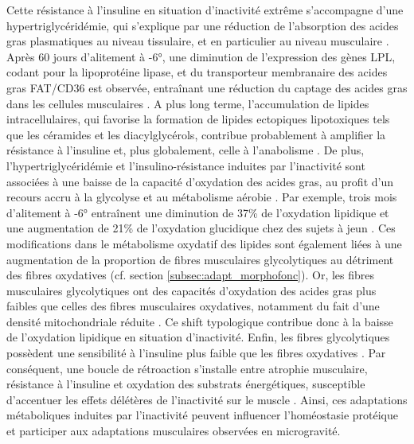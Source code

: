 \documentclass[11pt]{report}
\begin{document}
Cette résistance à l'insuline en situation d'inactivité extrême s'accompagne d'une hypertriglycéridémie, qui s'explique par une réduction de l'absorption des acides gras plasmatiques au niveau tissulaire, et en particulier au niveau musculaire \parencite{bergouignan_physical_2011}. Après 60 jours d'alitement à -6°, une diminution de l'expression des gènes LPL, codant pour la lipoprotéine lipase, et du transporteur membranaire des acides gras FAT/CD36 est observée, entraînant une réduction du captage des acides gras dans les cellules musculaires \parencite{Bergouignan2009Feb}. A plus long terme, l'accumulation de lipides intracellulaires, qui favorise la formation de lipides ectopiques lipotoxiques tels que les céramides et les diacylglycérols, contribue probablement à amplifier la résistance à l'insuline et, plus globalement, celle à l'anabolisme \parencite{Eggelbusch2024Jan,Kwon2016Nov}. De plus, l'hypertriglycéridémie et l'insulino-résistance induites par l'inactivité sont associées à une baisse de la capacité d'oxydation des acides gras, au profit d'un recours accru à la glycolyse et au métabolisme aérobie \parencite{bergouignan_physical_2011,Eggelbusch2024Jan}. Par exemple, trois mois d'alitement à -6° entraînent une diminution de 37\% de l'oxydation lipidique et une augmentation de 21\% de l'oxydation glucidique chez des sujets à jeun \parencite{Bergouignan2006Sep}. Ces modifications dans le métabolisme oxydatif des lipides sont également liées à une augmentation de la proportion de fibres musculaires glycolytiques au détriment des fibres oxydatives (cf. section \ref{subsec:adapt_morphofonc}). Or, les fibres musculaires glycolytiques ont des capacités d'oxydation des acides gras plus faibles que celles des fibres musculaires oxydatives, notamment du fait d'une densité mitochondriale réduite \parencite{Kuznetsov2025Oct}. Ce shift typologique contribue donc à la baisse de l'oxydation lipidique en situation d'inactivité. Enfin, les fibres glycolytiques possèdent une sensibilité à l'insuline plus faible que les fibres oxydatives \parencite{Stuart2013May,Albers2015Feb}. Par conséquent, une boucle de rétroaction s'installe entre atrophie musculaire, résistance à l'insuline et oxydation des substrats énergétiques, susceptible d'accentuer les effets délétères de l'inactivité sur le muscle \parencite{bergouignan_physical_2011}. Ainsi, ces adaptations métaboliques induites par l'inactivité peuvent influencer l'homéostasie protéique et participer aux adaptations musculaires observées en microgravité.
\end{document}
